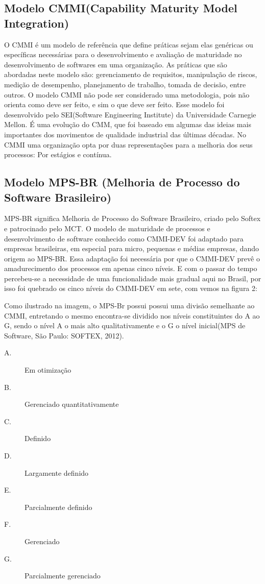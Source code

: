   \subsection{Modelo CMMI(Capability Maturity Model Integration)}
O CMMI é um modelo de referência que define práticas sejam elas genéricas ou específicas necessárias para o desenvolvimento e avaliação de maturidade no desenvolvimento de softwares em uma organização. As práticas que são abordadas neste modelo são: gerenciamento de requisitos, manipulação de riscos, medição de desempenho, planejamento de trabalho, tomada de decisão, entre outros. O modelo CMMI não pode ser considerado uma metodologia, pois não orienta como deve ser feito, e sim o que deve ser feito. Esse modelo foi desenvolvido pelo SEI(Software Engineering Institute) da Universidade Carnegie Mellon. É uma evolução do CMM, que foi baseado em algumas das ideias mais importantes dos movimentos de qualidade industrial das últimas décadas.
No CMMI uma organização opta por duas representações para a melhoria dos seus processos: Por estágios e contínua.

  \subsection{Modelo MPS-BR (Melhoria de Processo do Software Brasileiro)}
MPS-BR significa Melhoria de Processo do Software Brasileiro, criado pelo Softex e patrocinado pelo MCT. O modelo de maturidade de processos e desenvolvimento de software conhecido como CMMI-DEV foi adaptado para empresas brasileiras, em especial para micro, pequenas e médias empresas, dando origem ao MPS-BR. Essa adaptação foi necessária por que o CMMI-DEV prevê o amadurecimento dos processos em apenas cinco níveis.				
E com o passar do tempo percebeu-se a necessidade de uma funcionalidade mais gradual aqui no Brasil, por isso foi quebrado os cinco níveis do CMMI-DEV em sete, com vemos na figura 2:


Como ilustrado na imagem, o MPS-Br possui possui uma divisão semelhante ao CMMI, entretando o mesmo encontra-se dividido nos níveis constituintes do A ao G, sendo o nível A o mais alto qualitativamente e o G o nível inicial(MPS de Software, São Paulo: SOFTEX, 2012).	
\begin{description}
\item[A.] Em otimização
\item[B.] Gerenciado quantitativamente
\item[C.] Definido
\item[D.] Largamente definido
\item[E.] Parcialmente definido
\item[F.] Gerenciado
\item[G.] Parcialmente gerenciado	
\end{description}			

